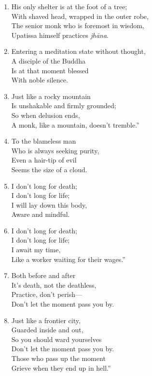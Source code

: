 \documentclass[10pt, openany]{book}
\newcommand*{\vleftofline}[1]{\leavevmode\llap{#1}}
\begin{document}
\begin{enumerate}
\item \vleftofline{“}His only shelter is at the foot of a tree;\\
With shaved head, wrapped in the outer robe,\\
The senior monk who is foremost in wisdom,\\
Upatissa himself practices \emph{jhāna}.

\item Entering a meditation state without thought,\\
A disciple of the Buddha\\
Is at that moment blessed\\
With noble silence.

\item Just like a rocky mountain\\
Is unshakable and firmly grounded;\\
So when delusion ends,\\
A monk, like a mountain, doesn’t tremble.”

\item \vleftofline{“}To the blameless man\\
Who is always seeking purity,\\
Even a hair-tip of evil\\
Seems the size of a cloud.

\item I don’t long for death;\\
I don’t long for life;\\
I will lay down this body,\\
Aware and mindful.

\item I don’t long for death;\\
I don’t long for life;\\
I await my time,\\
Like a worker waiting for their wages.”

\item \vleftofline{“}Both before and after\\
It’s death, not the deathless,\\
Practice, don’t perish—\\
Don’t let the moment pass you by.

\item Just like a frontier city,\\
Guarded inside and out,\\
So you should ward yourselves\\
Don’t let the moment pass you by.\\
Those who pass up the moment\\
Grieve when they end up in hell.”


\end{enumerate}
\end{document}
